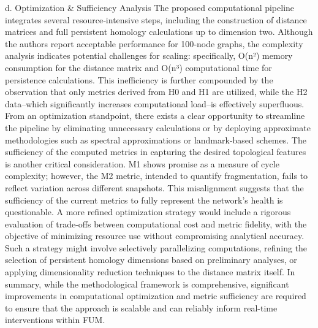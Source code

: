 \documentclass{article}
\begin{document}
d. Optimization \& Sufficiency Analysis  
The proposed computational pipeline integrates several resource‐intensive steps, including the construction of distance matrices and full persistent homology calculations up to dimension two. Although the authors report acceptable performance for 100‐node graphs, the complexity analysis indicates potential challenges for scaling: specifically, O(n²) memory consumption for the distance matrix and O(n³) computational time for persistence calculations. This inefficiency is further compounded by the observation that only metrics derived from H0 and H1 are utilized, while the H2 data--which significantly increases computational load--is effectively superfluous. From an optimization standpoint, there exists a clear opportunity to streamline the pipeline by eliminating unnecessary calculations or by deploying approximate methodologies such as spectral approximations or landmark-based schemes. The sufficiency of the computed metrics in capturing the desired topological features is another critical consideration. M1 shows promise as a measure of cycle complexity; however, the M2 metric, intended to quantify fragmentation, fails to reflect variation across different snapshots. This misalignment suggests that the sufficiency of the current metrics to fully represent the network’s health is questionable. A more refined optimization strategy would include a rigorous evaluation of trade-offs between computational cost and metric fidelity, with the objective of minimizing resource use without compromising analytical accuracy. Such a strategy might involve selectively parallelizing computations, refining the selection of persistent homology dimensions based on preliminary analyses, or applying dimensionality reduction techniques to the distance matrix itself. In summary, while the methodological framework is comprehensive, significant improvements in computational optimization and metric sufficiency are required to ensure that the approach is scalable and can reliably inform real-time interventions within FUM.
\end{document}
